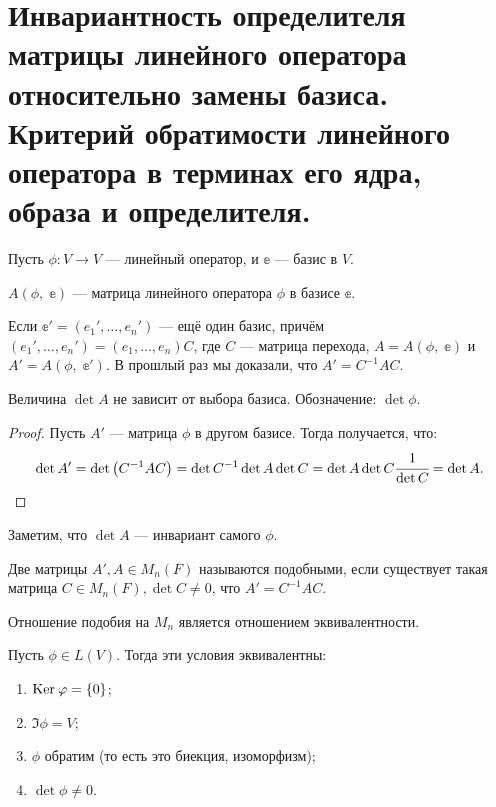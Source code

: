 \section{Инвариантность определителя матрицы линейного оператора относительно замены базиса. Критерий обратимости линейного оператора в терминах его ядра, образа и определителя.}

Пусть $\phi\colon V \rightarrow V$ --- линейный оператор, и $\mathbb{e}$ --- базис в $V$. 

\begin{Designation}
    $A(\phi,\;\mathbb{e})$ --- матрица линейного оператора $\phi$ в базисе $\mathbb{e}$.
\end{Designation}

Если $\mathbb{e}' = (e_1', \ldots, e_n')$ --- ещё один базис, причём $(e_1', \ldots, e_n') = (e_1, \ldots, e_n)C$, где $C$ --- матрица перехода, $A = A(\phi,\; \mathbb{e})$ и  $A' = A(\phi,\; \mathbb{e}')$.
В прошлый раз мы доказали, что $A' = C^{-1}AC$.

\begin{Consequence}
    Величина $\det A$ не зависит от выбора базиса. Обозначение: $\det\phi$.
\end{Consequence}

\begin{proof}
    Пусть $A'$ --- матрица $\phi$ в другом базисе. Тогда получается, что:
    \begin{gather*}
        \det A' = \det \left(C^{-1}AC\right) = \det C^{-1} \det A \det C = \det A \det C \cfrac{1}{\det C} = \det A.
    \end{gather*}
\end{proof}

Заметим, что $\det A$ --- инвариант самого $\phi$. 

\begin{Def}
    Две матрицы $A', A \in M_n(F)$ называются подобными, если существует такая матрица $C \in M_n(F), \det C \neq 0$, что $A' = C^{-1}AC$.
\end{Def}

\begin{Comment}
    Отношение подобия на $M_n$ является отношением эквивалентности. 
\end{Comment}

\begin{Suggestion}
    Пусть $\phi \in L(V)$. Тогда эти условия эквивалентны:
    \begin{enumerate}
        \item $\mathrm{Ker}\:\varphi = \{0\}$;
        \item $\Im \phi = V$;
        \item $\phi$ обратим (то есть это биекция, изоморфизм);
        \item $\det \phi \neq 0$.
    \end{enumerate}
\end{Suggestion}

